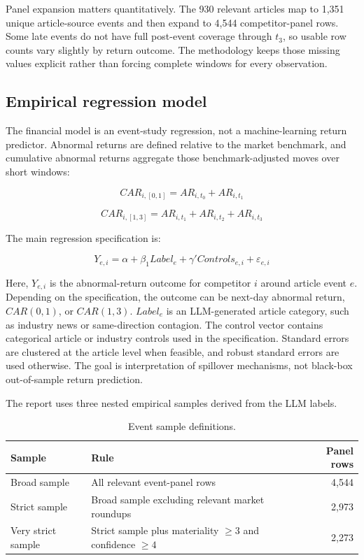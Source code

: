 \documentclass[11pt]{article}
\begin{document}
Panel expansion matters quantitatively. The 930 relevant articles map to 1,351 unique article-source events and then expand to 4,544 competitor-panel rows. Some late events do not have full post-event coverage through \(t_3\), so usable row counts vary slightly by return outcome. The methodology keeps those missing values explicit rather than forcing complete windows for every observation.

\subsection*{Empirical regression model}

The financial model is an event-study regression, not a machine-learning return predictor. Abnormal returns are defined relative to the market benchmark, and cumulative abnormal returns aggregate those benchmark-adjusted moves over short windows:

\[
CAR_{i,[0,1]} = AR_{i,t_0} + AR_{i,t_1}
\]

\[
CAR_{i,[1,3]} = AR_{i,t_1} + AR_{i,t_2} + AR_{i,t_3}
\]

The main regression specification is:

\[
Y_{e,i} = \alpha + \beta_1 Label_e + \gamma' Controls_{e,i} + \varepsilon_{e,i}
\]

Here, \(Y_{e,i}\) is the abnormal-return outcome for competitor \(i\) around article event \(e\). Depending on the specification, the outcome can be next-day abnormal return, \(CAR(0,1)\), or \(CAR(1,3)\). \(Label_e\) is an LLM-generated article category, such as industry news or same-direction contagion. The control vector contains categorical article or industry controls used in the specification. Standard errors are clustered at the article level when feasible, and robust standard errors are used otherwise. The goal is interpretation of spillover mechanisms, not black-box out-of-sample return prediction.

The report uses three nested empirical samples derived from the LLM labels.

\begin{table}[H]
    \centering
    \caption{Event sample definitions.}
    \small
    \begin{tabular}{>{\raggedright\arraybackslash}p{} >{\raggedright\arraybackslash}p{} r}
        \toprule
        Sample & Rule & Panel rows \\
        \midrule
        Broad sample & All relevant event-panel rows & 4,544 \\
        Strict sample & Broad sample excluding relevant market roundups & 2,973 \\
        Very strict sample & Strict sample plus materiality \(\geq 3\) and confidence \(\geq 4\) & 2,273 \\
        \bottomrule
    \end{tabular}
\end{table}
\end{document}
